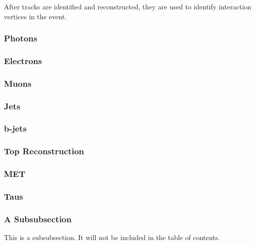 After tracks are identified and reconstructed, they are used to identify interaction vertices in the event.


\subsubsection{Photons} \label{sec:Photons} 

\subsubsection{Electrons} \label{sec:Photons} 

\subsubsection{Muons} \label{sec:Muons} 

\subsubsection{Jets} \label{sec:Jets} 

\subsubsection{b-jets} \label{sec:b-jets} 

\subsubsection{Top Reconstruction} \label{sec:top} 

\subsubsection{MET} \label{sec:MET} 

\subsubsection{Taus} \label{sec:taus} 


\subsubsection{A Subsubsection} \label{sec:example_subsubsection} 

This is a subsubsection. It will not be included in the table of contents. 


